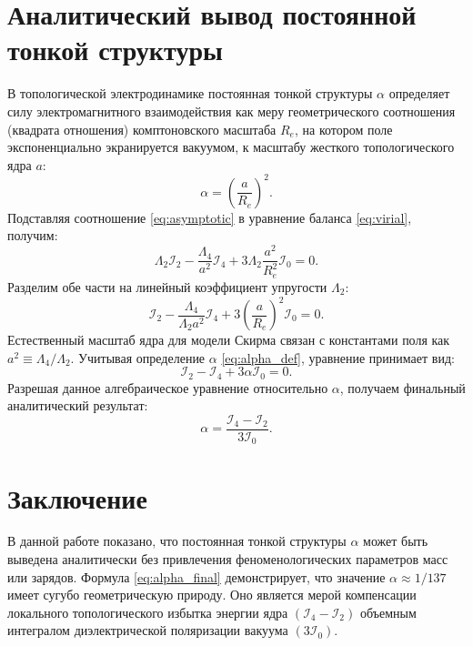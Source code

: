 \documentclass[12pt,a4paper]{article}
\begin{document}
\section{Аналитический вывод постоянной тонкой структуры}
В топологической электродинамике постоянная тонкой структуры $\alpha$ определяет силу электромагнитного взаимодействия как меру геометрического соотношения (квадрата отношения) комптоновского масштаба $R_e$, на котором поле экспоненциально экранируется вакуумом, к масштабу жесткого топологического ядра $a$:
\begin{equation}
\alpha = \left( \frac{a}{R_e} \right)^2.
\label{eq:alpha_def}
\end{equation}
Подставляя соотношение \eqref{eq:asymptotic} в уравнение баланса \eqref{eq:virial}, получим:
\begin{equation}
\Lambda_2 \mathcal{I}_2 - \frac{\Lambda_4}{a^2} \mathcal{I}_4 + 3 \Lambda_2 \frac{a^2}{R_e^2} \mathcal{I}_0 = 0.
\end{equation}
Разделим обе части на линейный коэффициент упругости $\Lambda_2$:
\begin{equation}
\mathcal{I}_2 - \frac{\Lambda_4}{\Lambda_2 a^2} \mathcal{I}_4 + 3 \left( \frac{a}{R_e} \right)^2 \mathcal{I}_0 = 0.
\end{equation}
Естественный масштаб ядра для модели Скирма связан с константами поля как $a^2 \equiv \Lambda_4 / \Lambda_2$. Учитывая определение $\alpha$ \eqref{eq:alpha_def}, уравнение принимает вид:
\begin{equation}
\mathcal{I}_2 - \mathcal{I}_4 + 3 \alpha \mathcal{I}_0 = 0.
\end{equation}
Разрешая данное алгебраическое уравнение относительно $\alpha$, получаем финальный аналитический результат:
\begin{equation}
\alpha = \frac{\mathcal{I}_4 - \mathcal{I}_2}{3 \mathcal{I}_0}.
\label{eq:alpha_final}
\end{equation}

\section{Заключение}
В данной работе показано, что постоянная тонкой структуры $\alpha$ может быть выведена аналитически без привлечения феноменологических параметров масс или зарядов. Формула \eqref{eq:alpha_final} демонстрирует, что значение $\alpha \approx 1/137$ имеет сугубо геометрическую природу. Оно является мерой компенсации локального топологического избытка энергии ядра $(\mathcal{I}_4 - \mathcal{I}_2)$ объемным интегралом диэлектрической поляризации вакуума $(3\mathcal{I}_0)$. 
\end{document}
